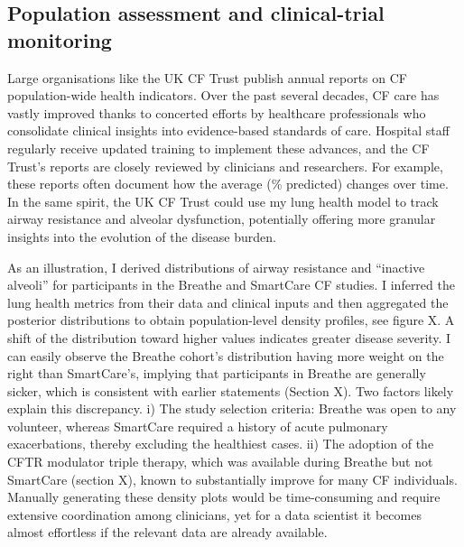 \subsection{Population assessment and clinical-trial monitoring}
Large organisations like the UK CF Trust publish annual reports on CF population-wide health indicators. Over the past several decades, CF care has vastly improved thanks to concerted efforts by healthcare professionals who consolidate clinical insights into evidence-based standards of care. Hospital staff regularly receive updated training to implement these advances, and the CF Trust's reports are closely reviewed by clinicians and researchers. For example, these reports often document how the average \F (\% predicted) changes over time. In the same spirit, the UK CF Trust could use my lung health model to track airway resistance and alveolar dysfunction, potentially offering more granular insights into the evolution of the disease burden.

As an illustration, I derived distributions of airway resistance and “inactive alveoli” for participants in the Breathe and SmartCare CF studies. I inferred the lung health metrics from their data and clinical inputs and then aggregated the posterior distributions to obtain population-level density profiles, see figure X. A shift of the distribution toward higher values indicates greater disease severity. I can easily observe the Breathe cohort's distribution having more weight on the right than SmartCare's, implying that participants in Breathe are generally sicker, which is consistent with earlier statements (Section X). Two factors likely explain this discrepancy. i) The study selection criteria: Breathe was open to any volunteer, whereas SmartCare required a history of acute pulmonary exacerbations, thereby excluding the healthiest cases. ii) The adoption of the CFTR modulator triple therapy, which was available during Breathe but not SmartCare (section X), known to substantially improve \F for many CF individuals. Manually generating these density plots would be time-consuming and require extensive coordination among clinicians, yet for a data scientist it becomes almost effortless if the relevant data are already available.


